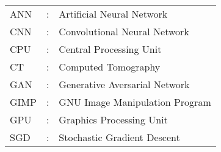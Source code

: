 \begin{tabular}{lcl}
ANN                 &:     & Artificial Neural Network \\
CNN                 &:     & Convolutional Neural Network \\
CPU                 &:     & Central Processing Unit \\
CT                  &:     & Computed Tomography \\
GAN                 &:     & Generative Aversarial Network \\
GIMP                &:     & GNU Image Manipulation Program \\
GPU                 &:     & Graphics Processing Unit \\
SGD                 &:     & Stochastic Gradient Descent \\
\end{tabular}